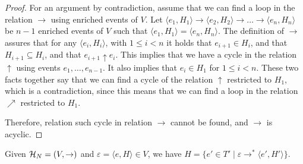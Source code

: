 \begin{proof}
For an argument by contradiction, assume that we can find a loop in the
relation $\to$ using enriched events of $V$.  Let $\langle e_1, H_1 \rangle \to
\langle e_2, H_2 \rangle \to \ldots \to \langle e_n, H_n \rangle$ be $n-1$
enriched events of $V$ such that $\langle e_1, H_1 \rangle = \langle e_n, H_n
\rangle$.  The definition of $\to$ assures that for any $\langle e_i, H_i
\rangle$, with $1 \le i < n$ it holds that $e_{i+1} \in H_i$, and that $H_{i+1}
\subseteq H_i$, and that $e_{i+1} \uparrow e_i$.  This implies that we have a
cycle in the relation $\uparrow$ using events $e_1, \ldots, e_{n-1}$.  It also
implies that $e_i \in H_1$ for $1 \le i < n$.  These two facts together say
that we can find a cycle of the relation $\uparrow$ restricted to $H_1$, which
is a contradiction, since this means that we can find a loop in the relation
$\nearrow$ restricted to $H_1$.

Therefore, relation such cycle in relation $\to$ cannot be found, and $\to$ is
acyclic.
\end{proof}

\setcounter{theorem}{13}
\begin{lemma}
Given $\mathcal{H}_{N} = (V, \to)$ and $\varepsilon = \langle e, H \rangle \in V$, we
have $H = \{e' \in T' \mid \varepsilon \to^* \langle e', H' \rangle\}$.
\end{lemma}


